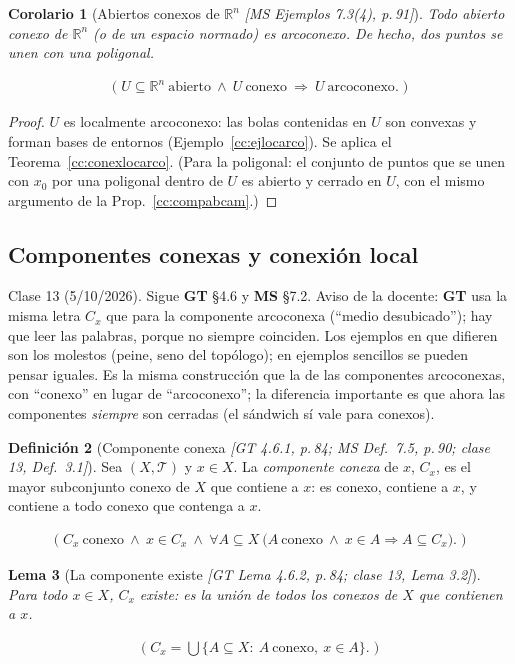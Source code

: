 \documentclass[11pt,a4paper]{article}
\newcommand{\lgc}[1]{\par\vspace{-3pt}\begin{gather*}\big(\;#1\;\big)\end{gather*}\vspace{-6pt}}
\theoremstyle{definition}
\newtheorem{definicion}{Definición}[section]
\theoremstyle{plain}
\newtheorem{lema}[definicion]{Lema}
\newtheorem{corolario}[definicion]{Corolario}
\newcommand{\fnt}[1]{{\normalfont\small\itshape\color{gray!150!black}[#1]}}
\newcommand{\R}{\mathbb{R}}
\newcommand{\tp}{\mathcal{T}}
\begin{document}
\begin{corolario}[Abiertos conexos de $\R^n$ \fnt{MS Ejemplos 7.3(4), p.\,91}]\label{cc:abiertosRn}
Todo abierto conexo de $\R^n$ (o de un espacio normado) es arcoconexo. De hecho, dos puntos se unen con una poligonal.
\lgc{U\subseteq\R^n\ \text{abierto}\ \wedge\ U\ \text{conexo}\ \Rightarrow\ U\ \text{arcoconexo}.}
\end{corolario}

\begin{proof}
$U$ es localmente arcoconexo: las bolas contenidas en $U$ son convexas y forman bases de entornos (Ejemplo~\ref{cc:ejlocarco}). Se aplica el Teorema~\ref{cc:conexlocarco}. (Para la poligonal: el conjunto de puntos que se unen con $x_0$ por una poligonal dentro de $U$ es abierto y cerrado en $U$, con el mismo argumento de la Prop.~\ref{cc:compabcam}.)
\end{proof}

\subsection{Componentes conexas y conexión local}\label{cc:compconex}

\noindent Clase 13 (5/10/2026). Sigue \textbf{GT} \S4.6 y \textbf{MS} \S7.2. Aviso de la docente: \textbf{GT} usa la misma letra $C_x$ que para la componente arcoconexa (``medio desubicado''); hay que leer las palabras, porque no siempre coinciden. Los ejemplos en que difieren son los molestos (peine, seno del topólogo); en ejemplos sencillos se pueden pensar iguales. Es la misma construcción que la de las componentes arcoconexas, con ``conexo'' en lugar de ``arcoconexo''; la diferencia importante es que ahora las componentes \emph{siempre} son cerradas (el sándwich sí vale para conexos).

\begin{definicion}[Componente conexa \fnt{GT 4.6.1, p.\,84; MS Def.\ 7.5, p.\,90; clase 13, Def.\ 3.1}]\label{cc:defcomp}
Sea $(X,\tp)$ y $x\in X$. La \emph{componente conexa} de $x$, $C_x$, es el mayor subconjunto conexo de $X$ que contiene a $x$: es conexo, contiene a $x$, y contiene a todo conexo que contenga a $x$.
\lgc{C_x\ \text{conexo}\ \wedge\ x\in C_x\ \wedge\ \forall A\subseteq X\ \big(A\ \text{conexo}\ \wedge\ x\in A\Rightarrow A\subseteq C_x\big).}
\end{definicion}

\begin{lema}[La componente existe \fnt{GT Lema 4.6.2, p.\,84; clase 13, Lema 3.2}]\label{cc:existecomp}
Para todo $x\in X$, $C_x$ existe: es la unión de todos los conexos de $X$ que contienen a $x$.
\lgc{C_x=\bigcup\{A\subseteq X:\ A\ \text{conexo},\ x\in A\}.}
\end{lema}
\end{document}
